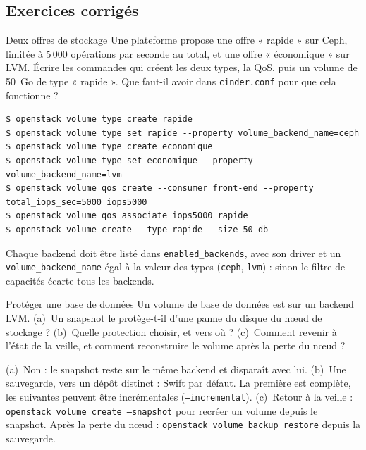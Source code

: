 \subsection{Exercices corrigés}\label{sec:ci-exercices}

\begin{exercice}{Deux offres de stockage}\label{ex:ci-types}
Une plateforme propose une offre « rapide » sur Ceph, limitée à 5\,000 opérations par seconde au total, et
une offre « économique » sur LVM. Écrire les commandes qui créent les deux types, la QoS, puis un volume de 50~Go de type
« rapide ». Que faut-il avoir dans \texttt{cinder.conf} pour que cela fonctionne ?
\end{exercice}
\begin{correction}
\begin{lstlisting}[style=terminal]
$ openstack volume type create rapide
$ openstack volume type set rapide --property volume_backend_name=ceph
$ openstack volume type create economique
$ openstack volume type set economique --property volume_backend_name=lvm
$ openstack volume qos create --consumer front-end --property total_iops_sec=5000 iops5000
$ openstack volume qos associate iops5000 rapide
$ openstack volume create --type rapide --size 50 db
\end{lstlisting}
Chaque backend doit être listé dans \texttt{enabled\_\allowbreak backends}, avec son driver et un \texttt{volume\_\allowbreak backend\_\allowbreak name}
égal à la valeur des types (\texttt{ceph}, \texttt{lvm}) : sinon le filtre de capacités écarte tous les backends.
\end{correction}

\begin{exercice}{Protéger une base de données}\label{ex:ci-protection}
Un volume de base de données est sur un backend LVM. (a)~Un snapshot le protège-t-il d'une panne du disque du nœud de
stockage ? (b)~Quelle protection choisir, et vers où ? (c)~Comment revenir à l'état de la veille, et comment reconstruire le volume
après la perte du nœud ?
\end{exercice}
\begin{correction}
(a)~Non : le snapshot reste sur le même backend et disparaît avec lui. (b)~Une sauvegarde, vers un dépôt distinct : Swift par défaut.
La première est complète, les suivantes peuvent être incrémentales (\texttt{--incremental}). (c)~Retour à la veille :
\texttt{openstack volume create --snapshot} pour recréer un volume depuis le snapshot. Après la perte du nœud :
\texttt{openstack volume backup restore} depuis la sauvegarde.
\end{correction}

